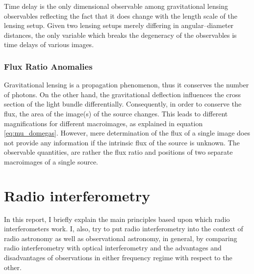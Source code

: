 \documentclass[paper=a4, fontsize=11pt]{scrartcl} %
\numberwithin{equation}{section} %
\numberwithin{figure}{section} %
\numberwithin{table}{section} %
\begin{document}
 Time delay is the only dimensional observable among gravitational lensing observables reflecting the fact that it does change with the length scale of the lensing setup. Given two lensing setups merely differing in angular--diameter distances, the only variable which breaks the degeneracy of the observables is time delays of various images.
 
 \subsubsection{Flux Ratio Anomalies}
 \label{subsec:Flux Ratio Anomalies}
Gravitational lensing is a propagation phenomenon, thus it conserves the number of photons. On the other hand, the gravitational deflection influences the cross section of the light bundle differentially. Consequently, in order to conserve the flux, the area of the image(s) of the source changes. This leads to different magnifications for different macroimages, as explained in equation \ref{eq:mu_domegas}. However, mere determination of the flux of a single image does not provide any information if the intrinsic flux of the source is unknown. The observable quantities, are rather the flux ratio and positions of two separate macroimages of a single source.


\newpage
\section{Radio interferometry}
In this report, I briefly explain the main principles based upon which radio interferometers work. I, also, try to put radio interferometry into the context of radio astronomy as well as observational astronomy, in general, by comparing radio interferometry with optical interferometry and the advantages and disadvantages of observations in either frequency regime with respect to the other.

\end{document}
